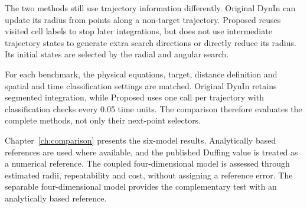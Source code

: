 The two methods still use trajectory information differently. Original DynIn can update its radius from points along a non-target trajectory. Proposed reuses visited cell labels to stop later integrations, but does not use intermediate trajectory states to generate extra search directions or directly reduce its radius. Its initial states are selected by the radial and angular search.

For each benchmark, the physical equations, target, distance definition and spatial and time classification settings are matched. Original DynIn retains segmented integration, while Proposed uses one  call per trajectory with classification checks every 0.05 time units. The comparison therefore evaluates the complete methods, not only their next-point selectors.

Chapter~\ref{ch:comparison} presents the six-model results. Analytically based references are used where available, and the published Duffing value is treated as a numerical reference. The coupled four-dimensional model is assessed through estimated radii, repeatability and cost, without assigning a reference error. The separable four-dimensional model provides the complementary test with an analytically based reference.
